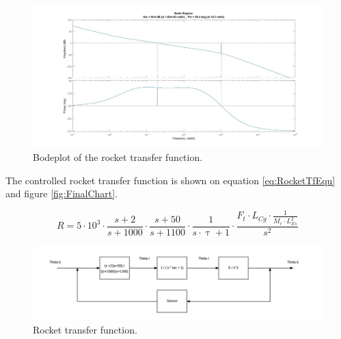 \begin{figure}[htbp]
	\centering
		\includegraphics[width=\textwidth]{figures/Rocket/design/bodeplot}
		\caption{Bodeplot of the rocket transfer function.}
		\label{fig:BodeplotFinalTf}
\end{figure}

The controlled rocket transfer function is shown on equation \autoref{eq:RocketTfEqu} and figure \autoref{fig:FinalChart}.

\begin{equation}    
R = 5 \cdot 10^3 \cdot \frac{s + 2}{s + 1000} \cdot \frac{s + 50}{s + 1100} \cdot \frac{1}{s \cdot \uptau + 1} \cdot \frac{F_t \cdot L_{Cg} \cdot \frac{1}{M_r \cdot L_{Es}^2}}{s^2}  
\end{equation}
\label{eq:RocketTfEqu}

\begin{figure}[htbp]
	\centering
	
	\includegraphics[width=\textwidth]{figures/Rocket/design/final_chart}
	\caption{Rocket transfer function.}
	\label{fig:FinalChart}
	
\end{figure}